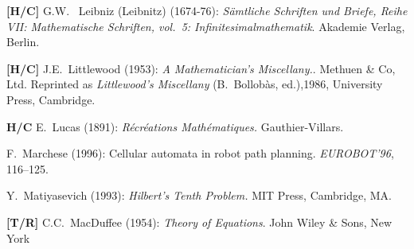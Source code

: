 \begin{thebibliography}{999}

{\bf [H/C]}
G.W.~ Leibniz (Leibnitz) (1674-76):
{\it S\"{a}mtliche Schriften und Briefe, Reihe VII: Mathematische Schriften, vol.~5: Infinitesimalmathematik}.  Akademie Verlag, Berlin.


 


{\bf [H/C]}
J.E.~Littlewood (1953):
{\it A Mathematician's Miscellany.}. Methuen \& Co, Ltd.
Reprinted as {\it Littlewood's Miscellany} (B.~Bollob\`{a}s, ed.),1986, University Press, Cambridge.



{\bf H/C}
E.~Lucas (1891):
{\it R\'{e}cr\'{e}ations Math\'{e}matiques.}
Gauthier-Villars.


F.~Marchese (1996): Cellular automata in robot path planning.  {\it EUROBOT'96}, 116--125.

Y.~Matiyasevich (1993): {\it Hilbert's Tenth Problem.}  MIT Press, Cambridge, MA.

{\bf [T/R]}
C.C.~MacDuffee (1954): {\it Theory of Equations}.  John Wiley \& Sons, New York



\end{thebibliography}

